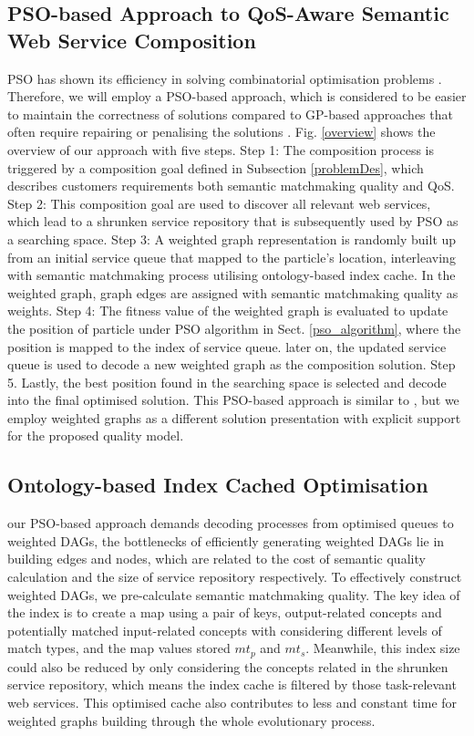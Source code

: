 \documentclass{llncs}
\begin{document}
\subsection{PSO-based Approach to QoS-Aware Semantic Web Service Composition}

PSO has shown its efficiency in solving combinatorial optimisation problems \cite{fukuyama2008fundamentals}. Therefore, we will employ a PSO-based approach, which is considered to be easier to maintain the correctness of solutions compared to GP-based approaches that often require repairing or penalising the solutions \cite{da2016particle}. Fig. \ref{overview} shows the overview of our approach with five steps. Step 1: The composition process is triggered by a composition goal defined in Subsection \ref{problemDes}, which describes customers requirements both semantic matchmaking quality and QoS. Step 2: This composition goal are used to discover all relevant web services, which lead to a shrunken service repository that is subsequently used by PSO as a searching space. Step 3: A weighted graph representation is randomly built up from an initial service queue that mapped to the particle's location, interleaving with semantic matchmaking process utilising ontology-based index cache. In the weighted graph, graph edges are assigned with semantic matchmaking quality as weights. Step 4: The fitness value of the weighted graph is evaluated to update the position of particle under PSO algorithm in Sect. \ref{pso_algorithm}, where the position is mapped to the index of service queue. later on, the updated service queue is used to decode a new weighted graph as the composition solution. Step 5. Lastly, the best position found in the searching space is selected and decode into the final optimised solution. This PSO-based approach is similar to \cite{da2016particle}, but we employ weighted graphs as a different solution presentation with explicit support for the proposed quality model.


\subsection{Ontology-based Index Cached Optimisation}\label{indexCache}
our PSO-based approach demands decoding processes from optimised queues to weighted DAGs, the bottlenecks of efficiently generating weighted DAGs lie in building edges and nodes, which are related to the cost of semantic quality calculation and the size of service repository respectively. To effectively construct weighted DAGs, we pre-calculate semantic matchmaking quality. The key idea of the index is to create a map using a pair of keys, output-related concepts and potentially matched input-related concepts with considering different levels of match types, and the map values stored $mt_{p}$ and $mt_{s}$. Meanwhile, this index size could also be reduced by only considering the concepts related in the shrunken service repository, which means the index cache is filtered by those task-relevant web services. This optimised cache also contributes to less and constant time for weighted graphs building through the whole evolutionary process.
\end{document}

